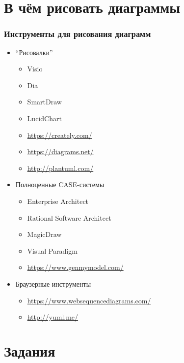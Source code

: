 \documentclass{../../slides-style}
\begin{document}
    
    \begin{frame}[plain]
        \titlepage
    \end{frame}

    \section{В чём рисовать диаграммы}

    \begin{frame}
        \frametitle{Инструменты для рисования диаграмм}
        \begin{itemize}
            \item ``Рисовалки''
            \begin{itemize}
                \item Visio
                \item Dia
                \item SmartDraw
                \item LucidChart
                \item \url{https://creately.com/}
                \item \url{https://diagrams.net/}
                \item \url{http://plantuml.com/}
            \end{itemize}
            \item Полноценные CASE-системы
            \begin{itemize}
                \item Enterprise Architect
                \item Rational Software Architect
                \item MagicDraw
                \item Visual Paradigm
                \item \url{https://www.genmymodel.com/}
            \end{itemize}
            \item Браузерные инструменты
            \begin{itemize}
                \item \url{https://www.websequencediagrams.com/}
                \item \url{http://yuml.me/}
            \end{itemize}
        \end{itemize}
    \end{frame}

    \section{Задания}
\end{document}
